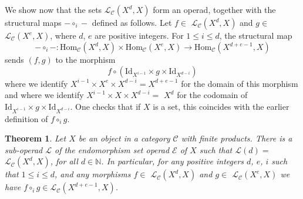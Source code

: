 \documentclass{amsart} %
\theoremstyle{plain}\newtheorem{Theorem}{Theorem}[section]
\theoremstyle{plain}\newtheorem{Conjecture}[Theorem]{Conjecture}
\theoremstyle{plain}\newtheorem{Corollary}[Theorem]{Corollary}
\theoremstyle{plain}\newtheorem{Lemma}[Theorem]{Lemma}
\theoremstyle{plain}\newtheorem{Proposition}[Theorem]{Proposition}
\theoremstyle{definition}\newtheorem{Definition}[Theorem]{Definition}
\theoremstyle{definition}\newtheorem{Example}[Theorem]{Example}
\theoremstyle{definition}\newtheorem{Examples}[Theorem]{Examples}
\theoremstyle{definition}\newtheorem{Remark}[Theorem]{Remark}
\theoremstyle{definition}\newtheorem{Remarks}[Theorem]{Remarks}
\theoremstyle{plain}\newtheorem{Statement}[Theorem]{}
\def\CC{{\mathcal{C}}}    \def\OP{{\mathcal{O}P}}
\def\CE{{\mathcal{E}}}    \def\OR{{\mathcal{O}R}}
\def\CL{{\mathcal{L}}}  \def\bCL{{\mathbf{L}}}
\def\N{{\mathbb N}}
\def\Hom{\mathrm{Hom}}           \def\tenkS{\otimes_{kS}}
\def\Id{\mathrm{Id}}             \def\tenA{\otimes_A}
\begin{document}
We show now that the sets $\CL_\CC(X^d,X)$
form an operad, together with the structural maps
$-\circ_i -$ defined as follows.
Let $f\in$ $\CL_\CC(X^d,X)$ and $g\in$ $\CL_\CC(X^e,X)$, where
$d$, $e$ are positive integers. For $1\leq i \leq d$, the structural map
$$-\circ_i - : \Hom_\CC(X^d,X) \times \Hom_\CC(X^e,X) \to \Hom_\CC(X^{d+e-1},X)$$
sends $(f, g)$ to the morphism 
$$f \circ (\Id_{X^{i-1}}\times g \times \Id_{X^{d-i}})$$
where we identify $X^{i-1}\times X^e\times X^{d-i}=X^{d+e-1}$ for the domain
of  this morphism and where we identify $X^{i-1}\times X\times X^{d-i}=$ $X^d$
for the codomain of $ \Id_{X^{i-1}}\times g \times \Id_{X^{d-i}}$.
One checks that if $X$ is a set, this coincides with the earlier definition of $f\circ_i g$.

\begin{Theorem} \label{thm2}
Let $X$ be an object in a category $\CC$ with finite  products. 
There is a sub-operad $\CL$ of the endomorphism set
operad $\CE$ of $X$ such that $\CL(d)=$ $\CL_\CC(X^d,X)$, for all  $d\in \N$.
In particular, for any positive integers $d$, $e$, $i$ such that $1\leq i\leq d$,
and any morphisms $f\in$ $\CL_\CC(X^d,X)$ and $g\in$ $\CL_\CC(X^e,X)$ we have
$f\circ_i g \in \CL_\CC(X^{d+e-1},X)$. 
\end{Theorem}
\end{document}
